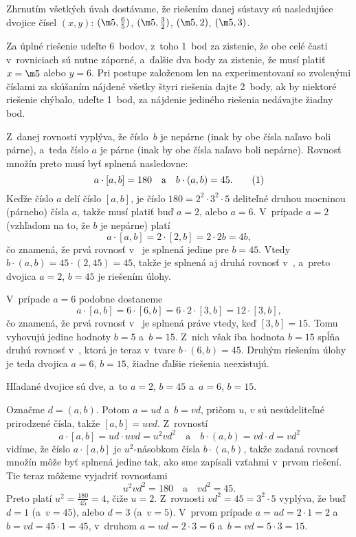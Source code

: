 {\zaver
Zhrnutím všetkých úvah dostávame, že riešením danej sústavy sú nasledujúce
dvojice čísel $(x, y)$: $(\m5, \frac{6}{5})$, $(\m5,\frac{3}{2})$, $(\m5, 2)$, $(\m5,3)$.

\nobreak\medskip\petit\noindent
Za úplné riešenie udeľte 6~bodov, z~toho 1~bod za zistenie, že obe celé časti
v~rovniciach sú nutne záporné, a~ďalšie dva body za zistenie, že musí platiť $x=\m5$ alebo $y=6$.
Pri postupe založenom len na experimentovaní so zvolenými číslami
za skúšaním nájdené všetky
štyri riešenia dajte 2~body, ak by niektoré riešenie chýbalo, udeľte 1~bod, za
nájdenie jediného riešenia nedávajte žiadny bod.
\endpetit
\bigbreak
}

{%
Z~danej rovnosti vyplýva, že číslo~$b$ je nepárne
(inak by obe čísla naľavo boli párne), a~teda číslo $a$
je párne (inak by obe čísla naľavo boli nepárne).
Rovnosť množín preto musí byť splnená nasledovne:
$$
a\cdot[a,b]=180\quad\text{a}\quad
b\cdot(a,b)=45.
\tag1
$$
Keďže číslo $a$ delí číslo $[a,b]$, je číslo
$180=2^2\cdot3^2\cdot5$ deliteľné druhou mocninou (párneho) čísla
$a$, takže musí platiť buď $a=2$, alebo $a=6$. V~prípade $a=2$
(vzhľadom na to, že $b$ je nepárne) platí
$$
a\cdot[a,b]=2\cdot[2,b]=2\cdot2b=4b,
$$
čo znamená, že prvá rovnosť v~ je splnená jedine pre $b=45$.
Vtedy $b\cdot(a,b)=45\cdot(2,45)=45$,  takže je splnená
aj druhá rovnosť v~, a~preto dvojica $a=2$, $b=45$ je
riešením úlohy.

V~prípade $a=6$ podobne dostaneme
$$
a\cdot[a,b]=6\cdot[6,b]=6\cdot2\cdot[3,b]=12\cdot[3,b],
$$
čo znamená, že prvá rovnosť v~ je splnená práve vtedy, keď
$[3,b]=15$. Tomu vyhovujú jedine hodnoty $b=5$ a~$b=15$.
Z~nich však iba hodnota $b=15$ spĺňa druhú rovnosť v~,
ktorá je teraz v~tvare $b\cdot(6,b)=45$. Druhým riešením úlohy je
teda dvojica $a=6$, $b=15$, žiadne ďalšie riešenia neexistujú.

\odpoved
Hľadané dvojice sú dve, a~to $a=2$, $b=45$
a~$a=6$, $b=15$.

\ineriesenie
Označme $d=(a,b)$. Potom $a=ud$ a~$b=vd$, pričom
$u$, $v$ sú nesúdeliteľné prirodzené čísla, takže $[a,b]=uvd$.
Z~rovností
$$
a\cdot[a,b]=ud\cdot uvd=u^2vd^2\quad\text{a}\quad
b\cdot(a,b)=vd\cdot d=vd^2
$$
vidíme, že číslo $a\cdot[a,b]$ je $u^2$-násobkom čísla
$b\cdot(a,b)$, takže zadaná rovnosť množín môže byť splnená
jedine tak, ako sme zapísali vzťahmi  v~prvom riešení.
Tie teraz môžeme vyjadriť rovnosťami
$$
u^2vd^2=180\quad\text{a}\quad vd^2=45.
$$
Preto platí $u^2=\frac{180}{45}=4$, čiže $u=2$. Z~rovnosti
$vd^2=45=3^2\cdot5$ vyplýva, že buď $d=1$ (a~$v=45$), alebo $d=3$
(a~$v=5$). V~prvom prípade $a=ud=2\cdot1=2$ a~$b=vd=45\cdot1=45$, v~druhom $a=ud=2\cdot3=6$ a~$b=vd=5\cdot3=15$.

}
